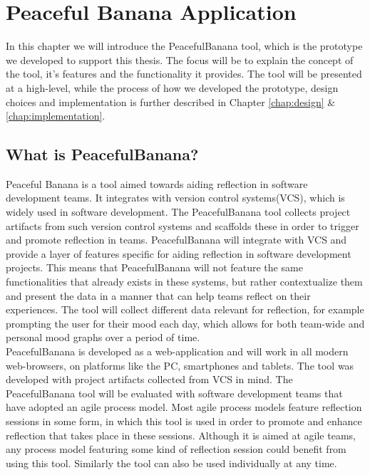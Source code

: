 \chapter{Peaceful Banana Application}
\label{peacefulBananaApplication}
In this chapter we will introduce the PeacefulBanana tool, which is the prototype we developed to support this thesis. The focus will be to explain the concept of the tool, it's features and the functionality it provides. The tool will be presented at a high-level, while the process of how we developed the prototype, design choices and implementation is further described in Chapter \ref{chap:design} \& \ref{chap:implementation}.
\section{What is PeacefulBanana?}
Peaceful Banana is a tool aimed towards aiding reflection in software development teams. It integrates with version control systems(VCS), which is widely used in software development. The PeacefulBanana tool collects project artifacts from such version control systems and scaffolds these in order to trigger and promote reflection in teams. PeacefulBanana will integrate with VCS and provide a layer of features specific for aiding reflection in software development projects. This means that PeacefulBanana will not feature the same functionalities that already exists in these systems, but rather contextualize them and present the data in a manner that can help teams reflect on their experiences. The tool will collect different data relevant for reflection, for example prompting the user for their mood each day, which allows for both team-wide and personal mood graphs over a period of time. \\
PeacefulBanana is developed as a web-application and will work in all modern web-browsers, on platforms like the PC, smartphones and tablets.
The tool was developed with project artifacts collected from VCS in mind. The PeacefulBanana tool will be evaluated with software development teams that have adopted an agile process model. Most agile process models feature reflection sessions in some form, in which this tool is used in order to promote and enhance reflection that takes place in these sessions. Although it is aimed at agile teams, any process model featuring some kind of reflection session could benefit from using this tool. Similarly the tool can also be used individually at any time. 

